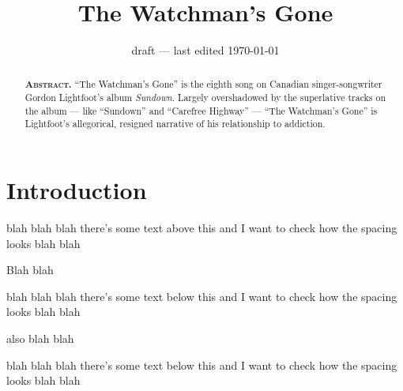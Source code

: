 \documentclass[draft]{article}
\title{The Watchman's Gone}
\author{%
	\authorship{\correspondence Gordon Lightfoot}{Toronto, Ontario, Canada}
}
\date{draft --- last edited \today}
\begin{document}
	\maketitle
	\begin{abstract}\noindent\textbf{\textsc{Abstract.}}
		``The Watchman's Gone'' is the eighth song on Canadian singer-songwriter Gordon Lightfoot's album \emph{Sundown}. Largely overshadowed by the superlative tracks on the album --- like ``Sundown'' and ``Carefree Highway'' --- ``The Watchman's Gone'' is Lightfoot's allegorical, resigned narrative of his relationship to addiction.
    \end{abstract}
    \vspace{-2em}
    {\tableofcontents}
    
	\section{Introduction}\label{section:introduction}
		
		
		blah blah blah there's some text above this and I want to check how the spacing looks blah blah
		
		\begin{bigtheorem}
			Blah blah	
		\end{bigtheorem}
		
		blah blah blah there's some text below this and I want to check how the spacing looks blah blah
		
		\begin{theorem}
			also blah blah	
		\end{theorem}
		
		blah blah blah there's some text below this and I want to check how the spacing looks blah blah


	
	\printbibliography[heading=bibintoc]
\end{document}
